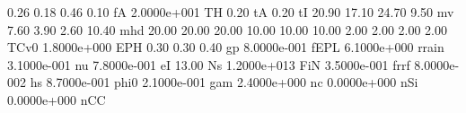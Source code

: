 0.26 0.18 0.46 0.10 fA
2.0000e+001    TH
0.20           tA
0.20           tI
20.90 17.10 24.70 9.50 mv 
7.60 3.90 2.60 10.40         mhd
20.00 20.00 20.00 10.00 10.00 10.00 2.00 2.00 2.00 2.00  TCv0
1.8000e+000   EPH
0.30 0.30 0.40 gp
8.0000e-001  fEPL
6.1000e+000 rrain
3.1000e-001    nu
7.8000e-001    eI
13.00          Ns
1.2000e+013   FiN
3.5000e-001  frrf
8.0000e-002    hs
8.7000e-001  phi0
2.1000e-001   gam
2.4000e+000    nc
0.0000e+000   nSi
0.0000e+000   nCC
